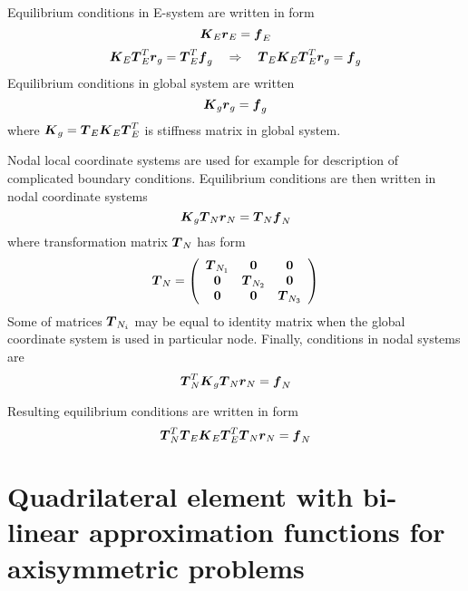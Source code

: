 Equilibrium conditions in E-system are written in form
\begin{equation}
\mbox{\boldmath$K$}_E \mbox{\boldmath$r$}_E = \mbox{\boldmath$f$}_E
\end{equation}
\begin{equation}
\mbox{\boldmath$K$}_E \mbox{\boldmath$T$}^T_E \mbox{\boldmath$r$}_g = \mbox{\boldmath$T$}_E^T \mbox{\boldmath$f$}_g
\ \ \ \Rightarrow \ \ \
\mbox{\boldmath$T$}_E \mbox{\boldmath$K$}_E \mbox{\boldmath$T$}^T_E \mbox{\boldmath$r$}_g = \mbox{\boldmath$f$}_g
\end{equation}
Equilibrium conditions in global system are written
\begin{equation}
\mbox{\boldmath$K$}_g \mbox{\boldmath$r$}_g = \mbox{\boldmath$f$}_g
\end{equation}
where $\mbox{\boldmath$K$}_g=\mbox{\boldmath$T$}_E \mbox{\boldmath$K$}_E \mbox{\boldmath$T$}^T_E$ is stiffness matrix in global system.

Nodal local coordinate systems are used for example for description of complicated boundary conditions.
Equilibrium conditions are then written in nodal coordinate systems
\begin{equation}
\mbox{\boldmath$K$}_g \mbox{\boldmath$T$}_{N} \mbox{\boldmath$r$}_N = \mbox{\boldmath$T$}_{N} \mbox{\boldmath$f$}_N
\end{equation}
where transformation matrix $\mbox{\boldmath$T$}_{N}$ has form
\begin{equation}
\mbox{\boldmath$T$}_{N} = \left(\begin{array}{ccc}
\mbox{\boldmath$T$}_{N_1} & \mbox{\boldmath$0$} & \mbox{\boldmath$0$}
\\
\mbox{\boldmath$0$} & \mbox{\boldmath$T$}_{N_2} & \mbox{\boldmath$0$}
\\
\mbox{\boldmath$0$} & \mbox{\boldmath$0$} & \mbox{\boldmath$T$}_{N_3}
\end{array}\right)
\end{equation}
Some of matrices $\mbox{\boldmath$T$}_{N_i}$ may be equal to identity matrix when
the global coordinate system is used in particular node.
Finally, conditions in nodal systems are
\begin{equation}
\mbox{\boldmath$T$}_{N}^T \mbox{\boldmath$K$}_g \mbox{\boldmath$T$}_{N} \mbox{\boldmath$r$}_N = \mbox{\boldmath$f$}_N
\end{equation}


Resulting equilibrium conditions are written in form
\begin{equation}
\mbox{\boldmath$T$}_{N}^T \mbox{\boldmath$T$}_E \mbox{\boldmath$K$}_E \mbox{\boldmath$T$}^T_E \mbox{\boldmath$T$}_{N} \mbox{\boldmath$r$}_N = \mbox{\boldmath$f$}_N
\end{equation}

\section{Quadrilateral element with bi-linear approximation functions for axisymmetric problems}
\label{secthexlinelem}

